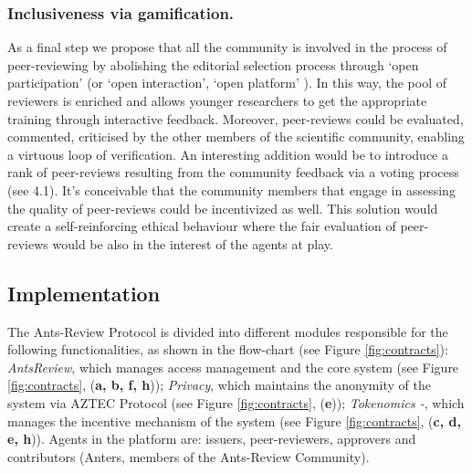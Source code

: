 \documentclass[runningheads]{llncs}
\begin{document}
\subsubsection{Inclusiveness via gamification.} As a final step we propose that all the community is involved in the process of peer-reviewing by abolishing the editorial selection process through `open participation' (or `open interaction', `open platform' \cite{OPR-Ross-Hellauer,RossHellauer-OPR}). In this way, the pool of reviewers is enriched and allows younger researchers to get the appropriate training through interactive feedback. Moreover, peer-reviews could be evaluated, commented, criticised by the other members of the scientific community, enabling a virtuous loop of verification. An interesting addition would be to introduce a rank of peer-reviews resulting from the community feedback via a voting process (see 4.1). It's conceivable that the community members that engage in assessing the quality of peer-reviews could be incentivized as well. This solution would create a self-reinforcing ethical behaviour where the fair evaluation of peer-reviews would be also in the interest of the agents at play.

\subsection{Implementation}
The Ants-Review Protocol is divided into different modules responsible for the following functionalities, as shown in the flow-chart (see Figure \ref{fig:contracts}):
\emph{AntsReview}, which manages access management and the core system (see Figure \ref{fig:contracts}, (\textbf{a, b, f, h}));
\emph{Privacy}, which maintains the anonymity of the system via AZTEC Protocol (see Figure  \ref{fig:contracts}, (\textbf{e}));
\emph{Tokenomics -}, which manages the incentive mechanism of the system (see Figure \ref{fig:contracts}, (\textbf{c, d, e, h})). \newline Agents in the platform are: issuers, peer-reviewers, approvers and contributors (Anters, members of the Ants-Review Community).
\end{document}
